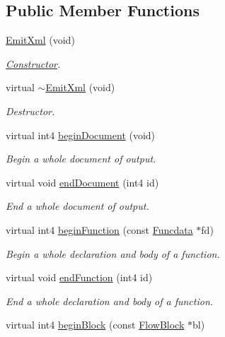 \subsection*{Public Member Functions}
\begin{DoxyCompactItemize}
\item 
\mbox{\hyperlink{class_emit_xml_a45b2a953af5ba09c8b77067c7cc5743e}{Emit\+Xml}} (void)
\begin{DoxyCompactList}\small\item\em \mbox{\hyperlink{class_constructor}{Constructor}}. \end{DoxyCompactList}\item 
virtual \mbox{\hyperlink{class_emit_xml_a632fe34bfbf8b475fc709625ce181087}{$\sim$\+Emit\+Xml}} (void)
\begin{DoxyCompactList}\small\item\em Destructor. \end{DoxyCompactList}\item 
virtual int4 \mbox{\hyperlink{class_emit_xml_a9a4891144e0743f2b10faa32e6d34181}{begin\+Document}} (void)
\begin{DoxyCompactList}\small\item\em Begin a whole document of output. \end{DoxyCompactList}\item 
virtual void \mbox{\hyperlink{class_emit_xml_a8f2e7a4f2cd9fee90bed1eb966414424}{end\+Document}} (int4 id)
\begin{DoxyCompactList}\small\item\em End a whole document of output. \end{DoxyCompactList}\item 
virtual int4 \mbox{\hyperlink{class_emit_xml_acff5f33b9ab6a4a036688160c98c0aa9}{begin\+Function}} (const \mbox{\hyperlink{class_funcdata}{Funcdata}} $\ast$fd)
\begin{DoxyCompactList}\small\item\em Begin a whole declaration and body of a function. \end{DoxyCompactList}\item 
virtual void \mbox{\hyperlink{class_emit_xml_ac1cfefc98a7cfbfa0c479cac8a1e2a71}{end\+Function}} (int4 id)
\begin{DoxyCompactList}\small\item\em End a whole declaration and body of a function. \end{DoxyCompactList}\item 
virtual int4 \mbox{\hyperlink{class_emit_xml_ad6cc09d4dfde00428eae8d556cd0fe72}{begin\+Block}} (const \mbox{\hyperlink{class_flow_block}{Flow\+Block}} $\ast$bl)

\end{DoxyCompactItemize}
